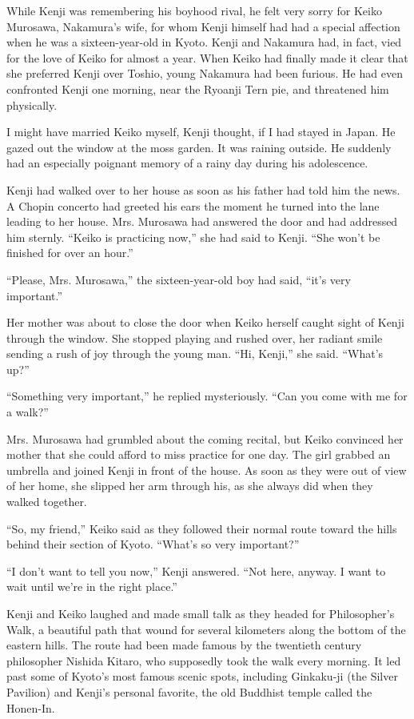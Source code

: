 \documentclass[]{article}
\begin{document}
{While Kenji was remembering his boyhood rival, he felt very sorry for Keiko Murosawa, Nakamura’s wife, for whom Kenji himself had had a special affection when he was a sixteen-year-old in Kyoto.  Kenji and Nakamura had, in fact, vied for the love of Keiko for almost a year.  When Keiko had finally made it clear that she preferred Kenji over Toshio, young Nakamura had been furious.  He had even confronted Kenji one morning, near the Ryoanji Tern pie, and threatened him physically.

I might have married Keiko myself, Kenji thought, if I had stayed in Japan.  He gazed out the window at the moss garden.  It was raining outside.  He suddenly had an especially poignant memory of a rainy day during his adolescence.

Kenji had walked over to her house as soon as his father had told him the news.  A Chopin concerto had greeted his ears the moment he turned into the lane leading to her house.  Mrs.  Murosawa had answered the door and had addressed him sternly.  “Keiko is practicing now,” she had said to Kenji.  “She won’t be finished for over an hour.”

“Please, Mrs.  Murosawa,” the sixteen-year-old boy had said, “it’s very important.”

Her mother was about to close the door when Keiko herself caught sight of Kenji through the window.  She stopped playing and rushed over, her radiant smile sending a rush of joy through the young man.  “Hi, Kenji,” she said.  “What’s up?”

“Something very important,” he replied mysteriously.  “Can you come with me for a walk?”

Mrs.  Murosawa had grumbled about the coming recital, but Keiko convinced her mother that she could afford to miss practice for one day.  The girl grabbed an umbrella and joined Kenji in front of the house.  As soon as they were out of view of her home, she slipped her arm through his, as she always did when they walked together.

“So, my friend,” Keiko said as they followed their normal route toward the hills behind their section of Kyoto.  “What’s so very important?”

“I don’t want to tell you now,” Kenji answered.  “Not here, anyway.  I want to wait until we’re in the right place.”

Kenji and Keiko laughed and made small talk as they headed for Philosopher’s Walk, a beautiful path that wound for several kilometers along the bottom of the eastern hills.  The route had been made famous by the twentieth century philosopher Nishida Kitaro, who supposedly took the walk every morning.  It led past some of Kyoto’s most famous scenic spots, including Ginkaku-ji (the Silver Pavilion) and Kenji’s personal favorite, the old Buddhist temple called the Honen-In.

}
\end{document}
